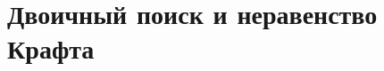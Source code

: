 \documentclass[discrete.tex]{subfiles}
\begin{document}
\section{Двоичный поиск и неравенство Крафта}
\end{document}
